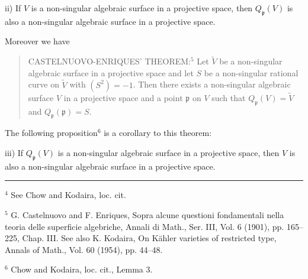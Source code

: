 ii) If $V$ is a non-singular algebraic surface in a projective space, then $Q_{\mathfrak p}(V)$ is also a non-singular algebraic surface in a projective space.

Moreover we have

\begin{quote}
CASTELNUOVO-ENRIQUES' THEOREM:$^5$ Let $\widetilde V$ be a non-singular algebraic surface in a projective space and let $S$ be a non-singular rational curve on $\widetilde V$ with $(S^2)=-1$. Then there exists a non-singular algebraic surface $V$ in a projective space and a point $\mathfrak p$ on $V$ such that $Q_{\mathfrak p}(V)=\widetilde V$ and $Q_{\mathfrak p}(\mathfrak p)=S$.
\end{quote}

The following proposition$^6$ is a corollary to this theorem:

iii) If $Q_{\mathfrak p}(V)$ is a non-singular algebraic surface in a projective space, then $V$ is also a non-singular algebraic surface in a projective space.

\noindent\rule{.28\linewidth}{.4pt}

${}^4$ See Chow and Kodaira, loc. cit.

${}^5$ G. Castelnuovo and F. Enriques, Sopra alcune questioni fondamentali nella teoria delle superficie algebriche, Annali di Math., Ser. III, Vol. 6 (1901), pp. 165--225, Chap. III. See also K. Kodaira, On Kähler varieties of restricted type, Annals of Math., Vol. 60 (1954), pp. 44--48.

${}^6$ Chow and Kodaira, loc. cit., Lemma 3.

